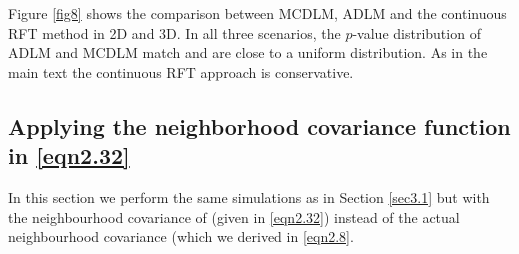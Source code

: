 \documentclass{article}
\begin{document}
Figure \ref{fig8} shows the comparison between MCDLM, ADLM and the continuous RFT method in 2D and 3D. In all three scenarios, the $p$-value distribution of ADLM and MCDLM match and are close to a uniform distribution. As in the main text the continuous RFT approach is conservative.

\subsection{Applying the neighborhood covariance function in \eqref{eqn2.32}}
\label{appendix.d2}
In this section we perform the same simulations as in Section \ref{sec3.1} but with the neighbourhood covariance of \cite{worsley2005improved} (given in \eqref{eqn2.32}) instead of the actual neighbourhood covariance (which we derived in \eqref{eqn2.8}. 
\end{document}
